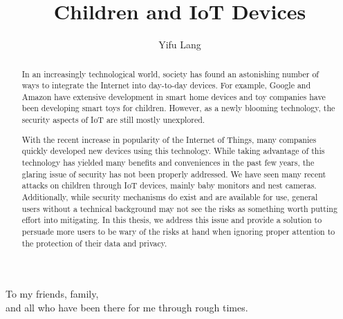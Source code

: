 \documentclass[12pt, draft]{ucthesis}
\begin{document}

\title{Children and IoT Devices}
\author{Yifu Lang}
\deanlinethree{}

\begin{frontmatter}

\maketitle
\copyrightpage

\tableofcontents
\listoffigures
\listoftables

\begin{abstract}
In an increasingly technological world, society has found an astonishing number of ways to integrate the Internet into day-to-day devices. For example, Google and Amazon have extensive development in smart home devices and toy companies have been developing smart toys for children. However, as a newly blooming technology, the security aspects of IoT are still mostly unexplored.

With the recent increase in popularity of the Internet of Things, many companies quickly developed new devices using this technology. While taking advantage of this technology has yielded many benefits and conveniences in the past few years, the glaring issue of security has not been properly addressed. We have seen many recent attacks on children through IoT devices, mainly baby monitors and nest cameras. Additionally, while security mechanisms do exist and are available for use, general users without a technical background may not see the risks as something worth putting effort into mitigating. In this thesis, we address this issue and provide a solution to persuade more users to be wary of the risks at hand when ignoring proper attention to the protection of their data and privacy.
    
\end{abstract}

\begin{dedication}
\null\vfil
{\large
\begin{center}
To my friends, family,\\\vspace{12pt}
and all who have been there for me through rough times.\\\vspace{12pt}
\end{center}}
\vfil\null
\end{dedication}


\end{frontmatter}
\end{document}

